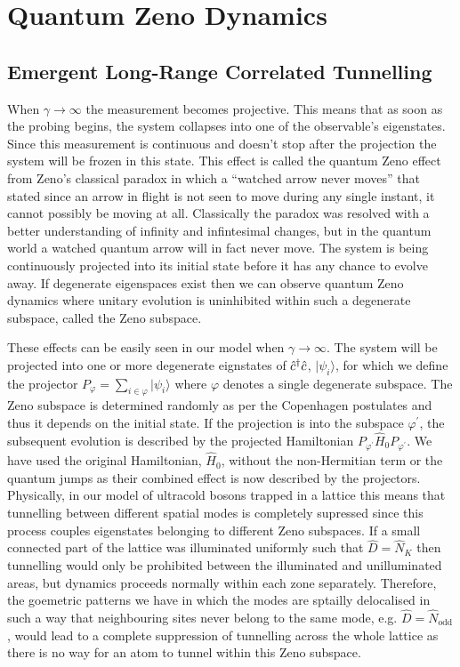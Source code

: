 \section{Quantum Zeno Dynamics}

\subsection{Emergent Long-Range Correlated Tunnelling}

When $\gamma \rightarrow \infty$ the measurement becomes
projective. This means that as soon as the probing begins, the system
collapses into one of the observable's eigenstates. Since this
measurement is continuous and doesn't stop after the projection the
system will be frozen in this state. This effect is called the quantum
Zeno effect from Zeno's classical paradox in which a ``watched arrow
never moves'' that stated since an arrow in flight is not seen to move
during any single instant, it cannot possibly be moving at
all. Classically the paradox was resolved with a better understanding
of infinity and infintesimal changes, but in the quantum world a
watched quantum arrow will in fact never move. The system is being
continuously projected into its initial state before it has any chance
to evolve away. If degenerate eigenspaces exist then we can observe
quantum Zeno dynamics where unitary evolution is uninhibited within
such a degenerate subspace, called the Zeno subspace.

These effects can be easily seen in our model when
$\gamma \rightarrow \infty$. The system will be projected into one or
more degenerate eignstates of $\hat{c}^\dagger \hat{c}$, $| \psi_i \rangle$, for which
we define the projector
$P_\varphi = \sum_{i \in \varphi} | \psi_i \rangle$ where $\varphi$
denotes a single degenerate subspace. The Zeno subspace is determined
randomly as per the Copenhagen postulates and thus it depends on the
initial state. If the projection is into the subspace
$\varphi^\prime$, the subsequent evolution is described by the
projected Hamiltonian
$P_{\varphi^\prime} \hat{H}_0 P_{\varphi^\prime}$. We have used the
original Hamiltonian, $\hat{H}_0$, without the non-Hermitian term or
the quantum jumps as their combined effect is now described by the
projectors. Physically, in our model of ultracold bosons trapped in a
lattice this means that tunnelling between different spatial modes is
completely supressed since this process couples eigenstates belonging
to different Zeno subspaces. If a small connected part of the lattice
was illuminated uniformly such that $\hat{D} = \hat{N}_K$ then
tunnelling would only be prohibited between the illuminated and
unilluminated areas, but dynamics proceeds normally within each zone
separately. Therefore, the goemetric patterns we have in which the
modes are sptailly delocalised in such a way that neighbouring sites
never belong to the same mode, e.g.  $\hat{D} = \hat{N}_\mathrm{odd}$,
would lead to a complete suppression of tunnelling across the whole
lattice as there is no way for an atom to tunnel within this Zeno
subspace.

